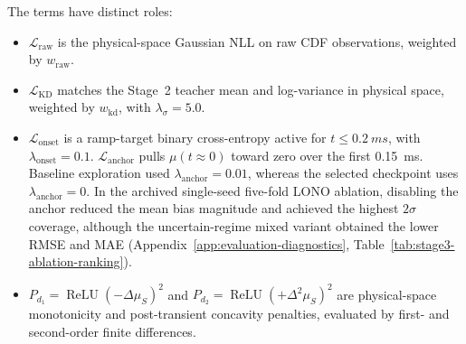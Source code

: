 The terms have distinct roles:
\begin{itemize}
  \item $\mathcal{L}_{\mathrm{raw}}$ is the physical-space Gaussian NLL on raw CDF observations, weighted by $w_{\mathrm{raw}}$.
  \item $\mathcal{L}_{\mathrm{KD}}$ matches the Stage~2 teacher mean and log-variance in physical space, weighted by $w_{\mathrm{kd}}$, with $\lambda_\sigma=5.0$.
  \item $\mathcal{L}_{\mathrm{onset}}$ is a ramp-target binary cross-entropy active for $t\leq\SI{0.2}{ms}$, with $\lambda_{\mathrm{onset}}=0.1$. $\mathcal{L}_{\mathrm{anchor}}$ pulls $\mu(t\approx0)$ toward zero over the first \SI{0.15}{ms}. Baseline exploration used $\lambda_{\mathrm{anchor}}=0.01$, whereas the selected checkpoint uses $\lambda_{\mathrm{anchor}}=0$. In the archived single-seed five-fold LONO ablation, disabling the anchor reduced the mean bias magnitude and achieved the highest $2\sigma$ coverage, although the uncertain-regime mixed variant obtained the lower RMSE and MAE (Appendix~\ref{app:evaluation-diagnostics}, Table~\ref{tab:stage3-ablation-ranking}).
  \item $P_{d_1}=\operatorname{ReLU}(-\Delta\mu_S)^2$ and $P_{d_2}=\operatorname{ReLU}(+\Delta^2\mu_S)^2$ are physical-space monotonicity and post-transient concavity penalties, evaluated by first- and second-order finite differences.
\end{itemize}

